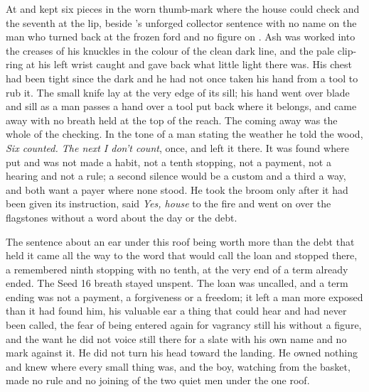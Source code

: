 \scenebreak

At  and   kept six pieces in the worn thumb-mark where the house could check and the seventh at the lip, beside 's unforged collector sentence with no name on the man who turned back at the frozen ford and no figure on . Ash was worked into the creases of his knuckles in the colour of the clean dark line, and the pale clip-ring at his left wrist caught and gave back what little light there was. His chest had been tight since the dark and he had not once taken his hand from a tool to rub it. The small knife lay at the very edge of its sill; his hand went over blade and sill as a man passes a hand over a tool put back where it belongs, and came away with no breath held at the top of the reach. The coming away was the whole of the checking. In the tone of a man stating the weather he told the wood, \emph{Six counted. The next I don't count}, once, and left it there. It was found where put and was not made a habit, not a tenth stopping, not a payment, not a hearing and not a rule; a second silence would be a custom and a third a way, and both want a payer where none stood. He took the broom only after it had been given its instruction, said \emph{Yes, house} to the fire and went on over the flagstones without a word about the day or the debt.

The sentence about an ear under this roof being worth more than the debt that held it came all the way to the word that would call the loan and stopped there, a remembered ninth stopping with no tenth, at the very end of a term already ended. The Seed 16 breath stayed unspent. The loan was uncalled, and a term ending was not a payment, a forgiveness or a freedom; it left a man more exposed than it had found him, his valuable ear a thing that could hear and had never been called, the fear of being entered again for vagrancy still his without a figure, and the want he did not voice still there for a slate with his own name and no mark against it. He did not turn his head toward the landing. He owned nothing and knew where every small thing was, and the boy, watching from the basket, made no rule and no joining of the two quiet men under the one roof.

